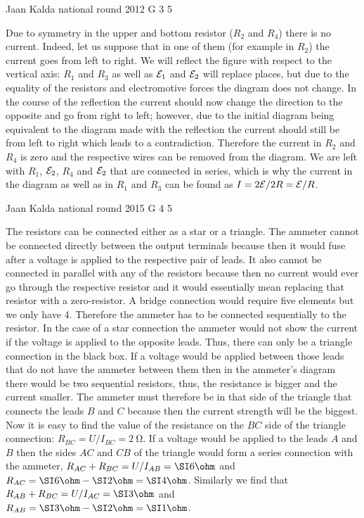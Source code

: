 \documentclass[11pt]{article}
\begin{document}
{Jaan Kalda} %
{national round} %
{2012} %
{G 3} %
{5} %
{

\ifEngSolution
Due to symmetry in the upper and bottom resistor ($R_2$ and $R_4$) there is no current. Indeed, let us suppose that in one of them (for example in $R_2$) the current goes from left to right. We will reflect the figure with respect to the vertical axis: $R_1$ and $R_3$ as well as ${\cal E}_1$ and ${\cal E}_2$ will replace places, but due to the equality of the resistors and electromotive forces the diagram does not change. In the course of the reflection the current should now change the direction to the opposite and go from right to left; however, due to the initial diagram being equivalent to the diagram made with the reflection the current should still be from left to right which leads to a contradiction. Therefore the current in $R_2$ and $R_4$ is zero and the respective wires can be removed from the diagram. We are left with $R_1$, ${\cal E}_2$, $R_4$ and ${\cal E}_2$ that are connected in series, which is why the current in the diagram as well as in $R_1$ and $R_3$ can be found as $I=2{\cal E}/2R = {\cal E}/R$.
\fi
}

{Jaan Kalda} %
{national round} %
{2015} %
{G 4} %
{5} %
{

\ifEngSolution
The resistors can be connected either as a star or a triangle. The ammeter cannot be connected directly between the output terminals because then it would fuse after a voltage is applied to the respective pair of leads. It also cannot be connected in parallel with any of the resistors because then no current would ever go through the respective resistor and it would essentially mean replacing that resistor with a zero-resistor. A bridge connection would require five elements but we only have 4. Therefore the ammeter has to be connected sequentially to the resistor. In the case of a star connection the ammeter would not show the current if the voltage is applied to the opposite leads. Thus, there can only be a triangle connection in the black box. If a voltage would be applied between those leads that do not have the ammeter between them then in the ammeter’s diagram there would be two sequential resistors, thus, the resistance is bigger and the current smaller. The ammeter must therefore be in that side of the triangle that connects the leads $B$ and $C$ because then the current strength will be the biggest. Now it is easy to find the value of the resistance on the $BC$ side of the triangle connection: $R_{BC}=U/I_{BC}=\SI{2}{\ohm}$. If a voltage would be applied to the leads $A$ and $B$ then the sides $AC$ and $CB$ of the triangle would form a series connection with the ammeter, $R_{AC}+R_{BC}=U/I_{AB}=\SI 6\ohm$ and $R_{AC}=\SI 6\ohm-\SI 2\ohm=\SI 4\ohm$. Similarly we find that $R_{AB}+R_{BC}=U/I_{AC}=\SI 3\ohm$ and $R_{AB}=\SI 3\ohm-\SI 2\ohm=\SI 1\ohm$.
\fi
}
\end{document}
